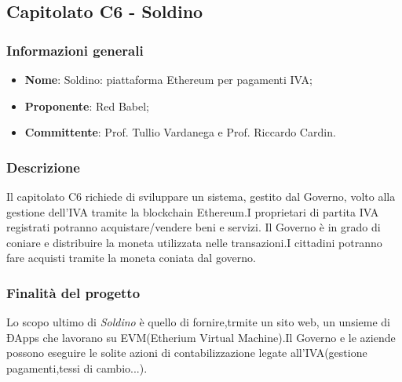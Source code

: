 \subsection{Capitolato C6 - Soldino}

\subsubsection{Informazioni generali}
\begin{itemize}
	\item \textbf {Nome}: Soldino: piattaforma Ethereum per pagamenti IVA;
	\item \textbf {Proponente}: Red Babel;
	\item \textbf {Committente}: Prof. Tullio Vardanega e Prof. Riccardo Cardin.
\end{itemize}

\subsubsection{Descrizione}
Il capitolato C6 richiede di sviluppare un sistema, gestito dal Governo, volto alla gestione dell'IVA tramite la blockchain Ethereum.I proprietari di partita IVA registrati potranno acquistare/vendere beni e servizi.
Il Governo è in grado di coniare e distribuire la moneta utilizzata nelle transazioni.I cittadini potranno fare acquisti tramite la moneta coniata dal governo.   

\subsubsection{Finalità del progetto}
Lo scopo ultimo di \textit{Soldino} è quello di fornire,trmite un sito web, un unsieme di ÐApps che lavorano su EVM(Etherium Virtual Machine).Il Governo e le aziende possono eseguire le solite azioni di contabilizzazione legate all'IVA(gestione pagamenti,tessi di cambio...).  
